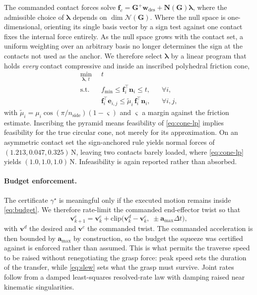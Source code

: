 The commanded contact forces solve
$\bm{f}_c = \bm{G}^{+}\bm{w}_{\mathrm{des}} + \bm{N}(\bm{G})\bm{\lambda}$, where the
admissible choice of $\bm{\lambda}$ depends on $\dim \mathcal{N}(\bm{G})$. Where the
null space is one-dimensional, orienting its single basis vector by a sign test
against one contact fixes the internal force entirely. As the null space grows with
the contact set, a uniform weighting over an arbitrary basis no longer determines the
sign at the contacts not used as the anchor. We therefore select $\bm{\lambda}$ by a
linear program that holds \emph{every} contact compressive and inside an inscribed
polyhedral friction cone,
%
\begin{equation}
\begin{aligned}
  \min_{\bm{\lambda},\, t} \;\; & t \\
  \text{s.t.}\;\; & f_{\min} \le \bm{f}_i^{\top}\bm{n}_i \le t, && \forall i, \\
                  & \bm{f}_i^{\top}\bm{e}_{i,j} \le \tilde{\mu}_i\, \bm{f}_i^{\top}\bm{n}_i,
                    && \forall i, j,
\end{aligned}
\label{eq:cone-lp}
\end{equation}
%
with $\tilde{\mu}_i = \mu_i \cos(\pi/n_{\mathrm{side}})(1 - \varsigma)$ and $\varsigma$
a margin against the friction estimate. Inscribing the pyramid means feasibility of
\eqref{eq:cone-lp} implies feasibility for the true circular cone, not merely for its
approximation. On an asymmetric contact set the sign-anchored rule yields normal
forces of $(1.213, 0.047, 0.325)\,\si{\newton}$, leaving two contacts barely loaded,
where \eqref{eq:cone-lp} yields $(1.0, 1.0, 1.0)\,\si{\newton}$. Infeasibility is again
reported rather than absorbed.

\paragraph{Budget enforcement.}
The certificate $\gamma^\star$ is meaningful only if the executed motion remains
inside \eqref{eq:budget}. We therefore rate-limit the commanded end-effector
twist so that
%
\begin{equation}
  \bm{v}^{c}_{k+1} = \bm{v}^{c}_{k} +
    \mathrm{clip}\bigl( \bm{v}^{d}_{k} - \bm{v}^{c}_{k},\; \pm \bm{a}_{\max} \Delta t \bigr),
  \label{eq:slew}
\end{equation}
%
with $\bm{v}^d$ the desired and $\bm{v}^c$ the commanded twist. The commanded
acceleration is then bounded by $\bm{a}_{\max}$ by construction, so the budget
the squeeze was certified against is enforced rather than assumed. This is what
permits the traverse speed to be raised without renegotiating the grasp
force: peak speed sets the duration of the transfer, while \eqref{eq:slew} sets
what the grasp must survive. Joint rates follow from a damped least-squares
resolved-rate law with damping raised near kinematic singularities.

